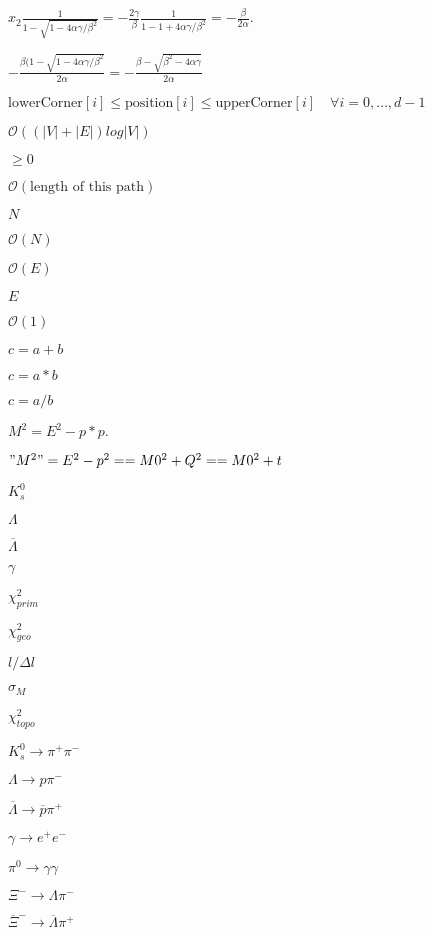 \documentclass{article}
\begin{document}
$ x_{2}\frac{1}{1-\sqrt{1-4\alpha\gamma/\beta^{2}}} = -\frac{2\gamma}{\beta}\frac{1}{1-1+4\alpha\gamma/\beta^{2}}=-\frac{\beta}{2\alpha}.$
\pagebreak

$ -\frac{\beta(1-\sqrt{1-4\alpha\gamma/\beta^{2}}}{2\alpha} = - \frac{\beta - \sqrt{\beta^{2}-4\alpha\gamma}}{2\alpha} $
\pagebreak

$\text{lowerCorner}[i] \le \text{position}[i] \le \text{upperCorner}[i] \quad \forall i=0, \dots, d-1$
\pagebreak

$\mathcal{O}((|V| + |E|) log |V|)$
\pagebreak

$\ge 0$
\pagebreak

$\mathcal{O}(\mbox{length of this path})$
\pagebreak

$N$
\pagebreak

$\mathcal{O}(N)$
\pagebreak

$\mathcal{O}(E)$
\pagebreak

$E$
\pagebreak

$\mathcal{O}(1)$
\pagebreak

$ c = a + b $
\pagebreak

$ c = a * b $
\pagebreak

$ c = a / b $
\pagebreak

$M^2 = E^2 - p*p.$
\pagebreak

$"M^2" = E^2 - p^2 == M0^2 + Q^2 == M0^2 + t$
\pagebreak

$K_s^0$
\pagebreak

$\Lambda$
\pagebreak

$\overline{\Lambda}$
\pagebreak

$\gamma$
\pagebreak

$\chi^2_{prim}$
\pagebreak

$\chi^2_{geo}$
\pagebreak

$l/\Delta l$
\pagebreak

$\sigma_{M}$
\pagebreak

$\chi^2_{topo}$
\pagebreak

$K_s^0\rightarrow\pi^+\pi^-$
\pagebreak

$\Lambda\rightarrow p\pi^-$
\pagebreak

$\overline{\Lambda}\rightarrow \overline{p}\pi^+$
\pagebreak

$\gamma\rightarrow e^+e^-$
\pagebreak

$\pi^0\rightarrow \gamma\gamma$
\pagebreak

$\Xi^-\rightarrow \Lambda\pi^-$
\pagebreak

$\overline{\Xi}^-\rightarrow \overline{\Lambda}\pi^+$
\pagebreak
\end{document}

